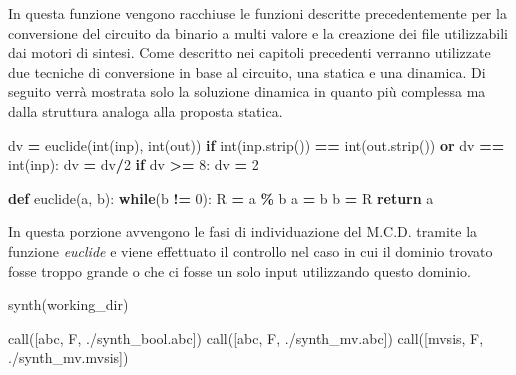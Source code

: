 \documentclass[
]{book}
\newenvironment{Shaded}{\begin{snugshade}}{\end{snugshade}}
\newcommand{\BuiltInTok}[1]{#1}
\newcommand{\ControlFlowTok}[1]{\textcolor[rgb]{0.13,0.29,0.53}{\textbf{#1}}}
\newcommand{\DecValTok}[1]{\textcolor[rgb]{0.00,0.00,0.81}{#1}}
\newcommand{\KeywordTok}[1]{\textcolor[rgb]{0.13,0.29,0.53}{\textbf{#1}}}
\newcommand{\NormalTok}[1]{#1}
\newcommand{\OperatorTok}[1]{\textcolor[rgb]{0.81,0.36,0.00}{\textbf{#1}}}
\newcommand{\StringTok}[1]{\textcolor[rgb]{0.31,0.60,0.02}{#1}}
\begin{document}
In questa funzione vengono racchiuse le funzioni descritte precedentemente per la conversione del circuito da binario a multi valore e la creazione dei file utilizzabili dai motori di sintesi. Come descritto nei capitoli precedenti verranno utilizzate due tecniche di conversione in base al circuito, una statica e una dinamica. Di seguito verrà mostrata solo la soluzione dinamica in quanto più complessa ma dalla struttura analoga alla proposta statica.

\newpage

\begin{Shaded}
\begin{Highlighting}[]
\NormalTok{dv }\OperatorTok{=}\NormalTok{ euclide(}\BuiltInTok{int}\NormalTok{(inp), }\BuiltInTok{int}\NormalTok{(out))}
  \ControlFlowTok{if} \BuiltInTok{int}\NormalTok{(inp.strip()) }\OperatorTok{==} \BuiltInTok{int}\NormalTok{(out.strip())}
    \KeywordTok{or}\NormalTok{ dv }\OperatorTok{==} \BuiltInTok{int}\NormalTok{(inp):}
\NormalTok{    dv }\OperatorTok{=}\NormalTok{ dv}\OperatorTok{/}\DecValTok{2}
  \ControlFlowTok{if}\NormalTok{ dv }\OperatorTok{\textgreater{}=} \DecValTok{8}\NormalTok{:}
\NormalTok{    dv }\OperatorTok{=} \DecValTok{2} 

\KeywordTok{def}\NormalTok{ euclide(a, b):}
  \ControlFlowTok{while}\NormalTok{(b }\OperatorTok{!=} \DecValTok{0}\NormalTok{):}
\NormalTok{    R }\OperatorTok{=}\NormalTok{ a }\OperatorTok{\%}\NormalTok{ b}
\NormalTok{    a }\OperatorTok{=}\NormalTok{ b}
\NormalTok{    b }\OperatorTok{=}\NormalTok{ R}
  \ControlFlowTok{return}\NormalTok{ a}
\end{Highlighting}
\end{Shaded}

In questa porzione avvengono le fasi di individuazione del M.C.D. tramite la funzione \emph{euclide} e viene effettuato il controllo nel caso in cui il dominio trovato fosse troppo grande o che ci fosse un solo input utilizzando questo dominio.

\begin{Shaded}
\begin{Highlighting}[]
\NormalTok{synth(working\_dir)}

\NormalTok{call([}\StringTok{\textquotesingle{}abc\textquotesingle{}}\NormalTok{, }\StringTok{\textquotesingle{}{-}F\textquotesingle{}}\NormalTok{, }\StringTok{\textquotesingle{}./synth\_bool.abc\textquotesingle{}}\NormalTok{])}
\NormalTok{call([}\StringTok{\textquotesingle{}abc\textquotesingle{}}\NormalTok{, }\StringTok{\textquotesingle{}{-}F\textquotesingle{}}\NormalTok{, }\StringTok{\textquotesingle{}./synth\_mv.abc\textquotesingle{}}\NormalTok{])}
\NormalTok{call([}\StringTok{\textquotesingle{}mvsis\textquotesingle{}}\NormalTok{, }\StringTok{\textquotesingle{}{-}F\textquotesingle{}}\NormalTok{, }\StringTok{\textquotesingle{}./synth\_mv.mvsis\textquotesingle{}}\NormalTok{])}
\end{Highlighting}
\end{Shaded}
\end{document}
